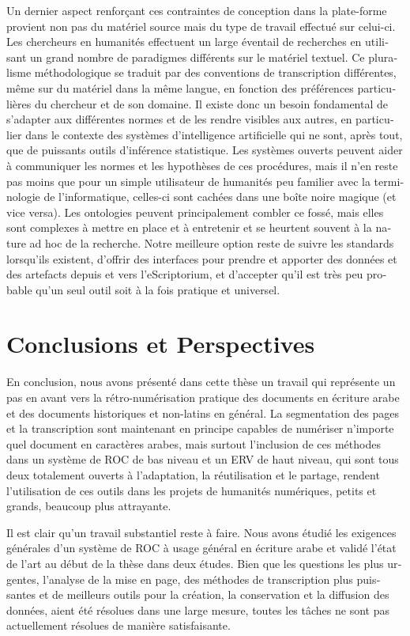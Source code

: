 \begin{french}
Un dernier aspect renforçant ces contraintes de conception dans la plate-forme
provient non pas du matériel source mais du type de travail effectué sur
celui-ci. Les chercheurs en humanités effectuent un large éventail de
recherches en utilisant un grand nombre de paradigmes différents sur le
matériel textuel. Ce pluralisme méthodologique se traduit par des conventions
de transcription différentes, même sur du matériel dans la même langue, en
fonction des préférences particulières du chercheur et de son domaine. Il
existe donc un besoin fondamental de s'adapter aux différentes normes et de les
rendre visibles aux autres, en particulier dans le contexte des systèmes
d'intelligence artificielle qui ne sont, après tout, que de puissants outils
d'inférence statistique. Les systèmes ouverts peuvent aider à communiquer les
normes et les hypothèses de ces procédures, mais il n'en reste pas moins que
pour un simple utilisateur de humanités peu familier avec la
terminologie de l'informatique, celles-ci sont cachées dans une boîte noire
magique (et vice versa).  Les ontologies peuvent principalement combler ce
fossé, mais elles sont complexes à mettre en place et à entretenir et se
heurtent souvent à la nature ad hoc de la recherche. Notre meilleure option
reste de suivre les standards lorsqu'ils existent, d'offrir des interfaces pour
prendre et apporter des données et des artefacts depuis et vers l'eScriptorium,
et d'accepter qu'il est très peu probable qu'un seul outil soit à la fois
pratique et universel.

\section{Conclusions et Perspectives}

En conclusion, nous avons présenté dans cette thèse un travail qui représente
un pas en avant vers la rétro-numérisation pratique des documents en écriture
arabe et des documents historiques et non-latins en général. La segmentation
des pages et la transcription sont maintenant en principe capables de numériser
n'importe quel document en caractères arabes, mais surtout l'inclusion de ces
méthodes dans un système de ROC de bas niveau et un ERV de haut niveau, qui
sont tous deux totalement ouverts à l'adaptation, la réutilisation et le
partage, rendent l'utilisation de ces outils dans les projets de humanités numériques, petits et grands, beaucoup plus attrayante.

Il est clair qu'un travail substantiel reste à faire. Nous avons étudié les
exigences générales d'un système de ROC à usage général en écriture arabe et
validé l'état de l'art au début de la thèse dans deux études. Bien que les
questions les plus urgentes, l'analyse de la mise en page, des méthodes de
transcription plus puissantes et de meilleurs outils pour la création, la
conservation et la diffusion des données, aient été résolues dans une large
mesure, toutes les tâches ne sont pas actuellement résolues de manière
satisfaisante.


\end{french}
